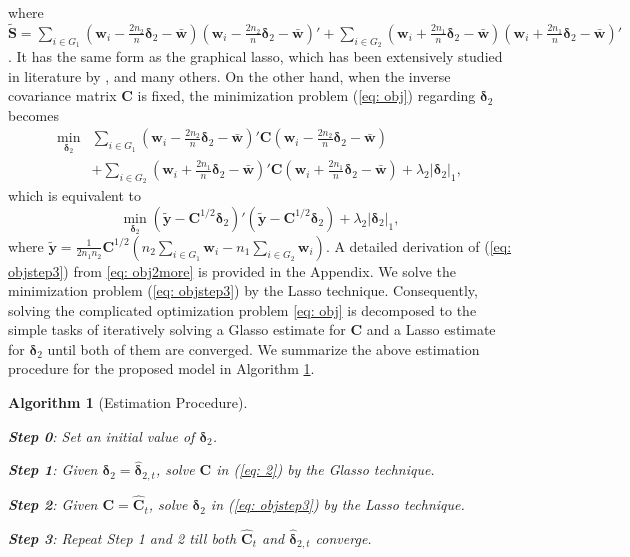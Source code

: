 \documentclass[12pt]{article}
\newtheorem{algorithm}{Algorithm}%
\begin{document}
where $\tilde{\bm S}=\sum_{i\in G_1}(\bm w_i-\frac{2n_2}{n}\bm \delta_2-\bar{\bm w})(\bm w_i-\frac{2n_2}{n}\bm \delta_2-\bar{\bm w})' + \sum_{i \in G_2}(\bm w_i+\frac{2n_1}{n}\bm \delta_2-\bar{\bm w})(\bm w_i+\frac{2n_1}{n}\bm \delta_2-\bar{\bm w})'$.
It has the same form as the graphical lasso, which has been extensively studied in literature by \cite{yuan2007model, friedman2008sparse, lam2009sparsistency, raskutti2009model, liu2020minimax}, and many others.
On the other hand, when the inverse covariance matrix $\bm C$ is fixed, the minimization problem (\ref{eq: obj}) regarding $\bm \delta_2$ becomes
\begin{align}\label{eq: obj2more}
\min_{\bm \delta_2}&\sum_{i\in G_1}(\bm w_i-\frac{2n_2}{n}\bm \delta_2-\bar{\bm w})'\bm C(\bm w_i-\frac{2n_2}{n}\bm \delta_2-\bar{\bm w})  \nonumber \\
&+\sum_{i \in G_2}(\bm w_i+\frac{2n_1}{n}\bm \delta_2-\bar{\bm w})'\bm C(\bm w_i+\frac{2n_1}{n}\bm \delta_2-\bar{\bm w})+\lambda_2|\bm \delta_2|_1,
\end{align}
which is equivalent to
\begin{equation}\label{eq: objstep3}
\min_{\bm \delta_2} (\tilde{\bm y} - \bm C^{1/2} \bm \delta_2)'(\tilde{\bm y} - \bm C^{1/2} \bm \delta_2)+\lambda_2|\bm \delta_2|_1,
\end{equation}
where $\tilde{\bm y}= \frac{1}{2n_1n_2}\bm C^{1/2}(n_2\sum\limits_{i \in G_1}\bm w_i - n_1\sum\limits_{i \in G_2}\bm w_i)$.
A detailed derivation of (\ref{eq: objstep3}) from \eqref{eq: obj2more} is provided in the Appendix.
We solve the minimization problem (\ref{eq: objstep3}) by the Lasso technique.
Consequently, solving the complicated optimization problem \eqref{eq: obj} is decomposed to the simple tasks of iteratively solving a Glasso estimate for $\bm C$ and a Lasso estimate for $\bm \delta_2$ until both of them are converged.
We summarize the above estimation procedure for the proposed model in Algorithm \ref{alg1}.

\begin{algorithm}[Estimation Procedure]\label{alg1}
\noindent

{\bf Step 0}: Set an initial value of $\bm \delta_2$.

{\bf Step 1}: Given $\bm \delta_2=\hat{\bm \delta}_{2,t}$, solve $\bm C$ in (\ref{eq: 2}) by the Glasso technique.

{\bf Step 2}: Given $\bm C= \hat{\bm C}_t$, solve $\bm \delta_2$ in (\ref{eq: objstep3}) by the Lasso technique.

{\bf Step 3}: Repeat \emph{Step 1} and \emph{2} till both $\hat{\bm C}_t$ and $\hat{\bm \delta}_{2,t}$ converge.

\end{algorithm}
\end{document}
